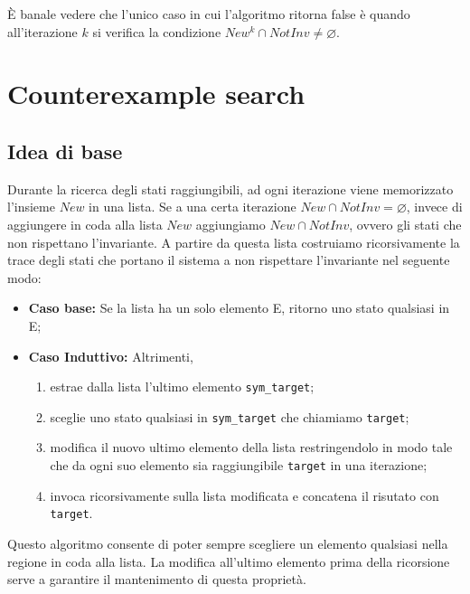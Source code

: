 \documentclass[12pt]{article}
\begin{document}
    È banale vedere che l'unico caso in cui l'algoritmo ritorna false è quando all'iterazione $k$ si verifica la condizione $New^k \cap NotInv \neq \varnothing$.
    
    \section{Counterexample search}
    \subsection{Idea di base}
    Durante la ricerca degli stati raggiungibili, ad ogni iterazione viene memorizzato l'insieme $New$ in una lista.
    Se a una certa iterazione $New \cap NotInv = \varnothing$, invece di aggiungere in coda alla lista $New$ aggiungiamo $New \cap NotInv$, ovvero gli stati che non rispettano l'invariante.
    A partire da questa lista costruiamo ricorsivamente la trace degli stati che portano il sistema a non rispettare l'invariante nel seguente modo:
    \begin{itemize}
        \item \textbf{Caso base:} Se la lista ha un solo elemento E, ritorno uno stato qualsiasi in E;
        \item \textbf{Caso Induttivo:} Altrimenti, 
        \begin{enumerate}
            \item estrae dalla lista l'ultimo elemento \texttt{sym\_target};
            \item sceglie uno stato qualsiasi in \texttt{sym\_target} che chiamiamo \texttt{target};
            \item modifica il nuovo ultimo elemento della lista restringendolo in modo tale che da ogni suo elemento sia raggiungibile \texttt{target} in una iterazione;
            \item invoca ricorsivamente sulla lista modificata e concatena il risutato con \texttt{target}.
        \end{enumerate}
    \end{itemize}

    Questo algoritmo consente di poter sempre scegliere un elemento qualsiasi nella regione in coda alla lista.
    La modifica all'ultimo elemento prima della ricorsione serve a garantire il mantenimento di questa proprietà.
\end{document}
